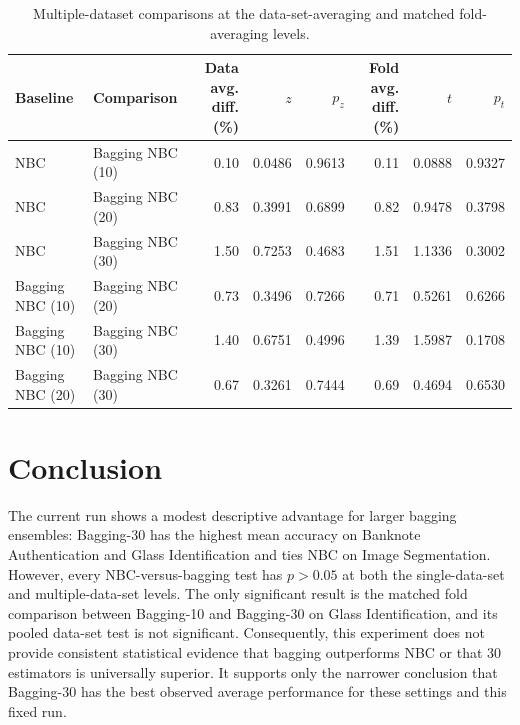 \documentclass[11pt]{article}
\begin{document}
\begin{table}[H]
\centering
\small
\caption{Multiple-dataset comparisons at the data-set-averaging and matched fold-averaging levels.}
\label{tab:multiple}
\setlength{\tabcolsep}{4pt}
\begin{tabular}{llrrrrrr}
\toprule
Baseline & Comparison & Data avg. diff. (\%) & $z$ & $p_z$ & Fold avg. diff. (\%) & $t$ & $p_t$ \\
\midrule
NBC & Bagging NBC (10) & 0.10 & 0.0486 & 0.9613 & 0.11 & 0.0888 & 0.9327 \\
NBC & Bagging NBC (20) & 0.83 & 0.3991 & 0.6899 & 0.82 & 0.9478 & 0.3798 \\
NBC & Bagging NBC (30) & 1.50 & 0.7253 & 0.4683 & 1.51 & 1.1336 & 0.3002 \\
Bagging NBC (10) & Bagging NBC (20) & 0.73 & 0.3496 & 0.7266 & 0.71 & 0.5261 & 0.6266 \\
Bagging NBC (10) & Bagging NBC (30) & 1.40 & 0.6751 & 0.4996 & 1.39 & 1.5987 & 0.1708 \\
Bagging NBC (20) & Bagging NBC (30) & 0.67 & 0.3261 & 0.7444 & 0.69 & 0.4694 & 0.6530 \\
\bottomrule
\end{tabular}
\end{table}

\section{Conclusion}
The current run shows a modest descriptive advantage for larger bagging ensembles: Bagging-30 has the highest mean accuracy on Banknote Authentication and Glass Identification and ties NBC on Image Segmentation. However, every NBC-versus-bagging test has $p>0.05$ at both the single-data-set and multiple-data-set levels. The only significant result is the matched fold comparison between Bagging-10 and Bagging-30 on Glass Identification, and its pooled data-set test is not significant. Consequently, this experiment does not provide consistent statistical evidence that bagging outperforms NBC or that 30 estimators is universally superior. It supports only the narrower conclusion that Bagging-30 has the best observed average performance for these settings and this fixed run.
\end{document}
